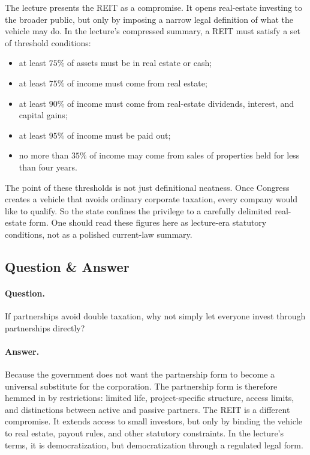 The lecture presents the REIT as a compromise. It opens real-estate investing to the broader public, but only by imposing a narrow legal definition of what the vehicle may do. In the lecture's compressed summary, a REIT must satisfy a set of threshold conditions:

\begin{itemize}
\item at least \(75\%\) of assets must be in real estate or cash;
\item at least \(75\%\) of income must come from real estate;
\item at least \(90\%\) of income must come from real-estate dividends, interest, and capital gains;
\item at least \(95\%\) of income must be paid out;
\item no more than \(35\%\) of income may come from sales of properties held for less than four years.
\end{itemize}

The point of these thresholds is not just definitional neatness. Once Congress creates a vehicle that avoids ordinary corporate taxation, every company would like to qualify. So the state confines the privilege to a carefully delimited real-estate form. One should read these figures here as lecture-era statutory conditions, not as a polished current-law summary.

\subsection{Question \& Answer}

\paragraph{Question.} If partnerships avoid double taxation, why not simply let everyone invest through partnerships directly?

\paragraph{Answer.} Because the government does not want the partnership form to become a universal substitute for the corporation. The partnership form is therefore hemmed in by restrictions: limited life, project-specific structure, access limits, and distinctions between active and passive partners. The REIT is a different compromise. It extends access to small investors, but only by binding the vehicle to real estate, payout rules, and other statutory constraints. In the lecture's terms, it is democratization, but democratization through a regulated legal form.

